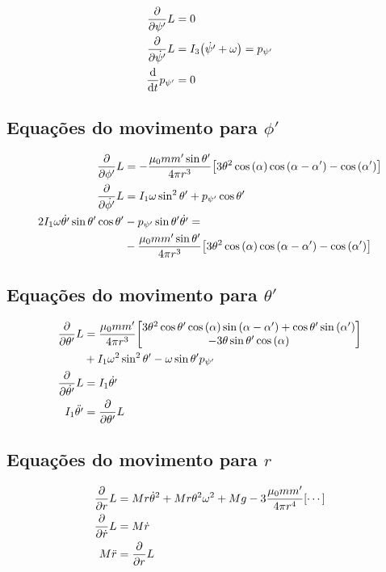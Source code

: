 \documentclass[a4paper, 12pt]{article}
\begin{document}
\begin{align}
    \pdv{}{\psi'}L&=0\nonumber\\
    \pdv{}{\dot{\psi'}}L&=I_3\qty(\dot{\psi'}+\omega)=p_{\psi'}\nonumber\\
    \dv{}{t}p_{\psi'}&=0
\end{align}

\subsection{Equações do movimento para $\phi'$}

\begin{align}
    \pdv{}{\phi'}L&=-\frac{\mu_0mm'\sin\theta'}{4\pi r^3}\qty[3\theta^2\cos\qty(\alpha)\cos\qty(\alpha-\alpha')-\cos\qty(\alpha')]\nonumber\\
    \pdv{}{\dot{\phi'}}L&=I_1\omega\sin^2\theta'+p_{\psi'}\cos\theta'\nonumber\\
    2I_1\omega\dot{\theta'}\sin\theta'\cos\theta'&-p_{\psi'}\sin\theta'\dot{\theta'}=\nonumber\\
    &-\frac{\mu_0mm'\sin\theta'}{4\pi r^3}\qty[3\theta^2\cos\qty(\alpha)\cos\qty(\alpha-\alpha')-\cos\qty(\alpha')]
\end{align}

\subsection{Equações do movimento para $\theta'$}

\begin{align}
    \pdv{}{\theta'}L&=\frac{\mu_0mm'}{4\pi r^3}\mqty[3\theta^2\cos\theta'\cos\qty(\alpha)\sin\qty(\alpha-\alpha')+\cos\theta'\sin\qty(\alpha')\\
    -3\theta\sin\theta'\cos\qty(\alpha)]\nonumber\\
    &+I_1\omega^2\sin^2\theta'-\omega\sin\theta'p_{\psi'}\nonumber\\
    \pdv{}{\dot{\theta'}}L&=I_1\dot{\theta'}\nonumber\\
    I_1\ddot{\theta'}&=\pdv{}{\theta'}L
\end{align}

\subsection{Equações do movimento para $r$}

\begin{align}
    \pdv{}{r}L&=Mr\dot{\theta}^2+Mr\theta^2\omega^2+Mg-3\frac{\mu_0mm'}{4\pi r^4}\qty[\cdots]\nonumber\\
    \pdv{}{\dot{r}}L&=M\dot{r}\nonumber\\
    M\ddot{r}&=\pdv{}{r}L
\end{align}
\end{document}
